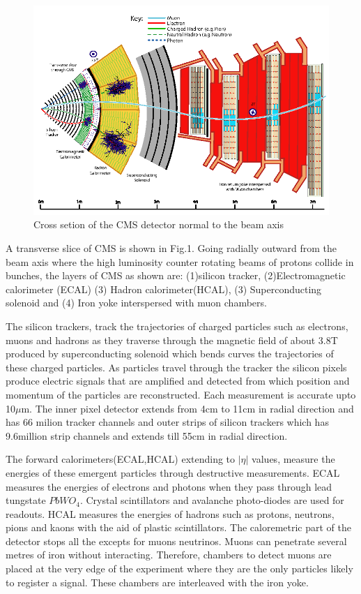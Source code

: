 \documentclass{article}		%
\begin{document}
\begin{figure}[h]
	\includegraphics[scale=0.6]{cms.png} 
	\caption{Cross setion of the CMS detector normal to the beam axis}
	\centering	
\end{figure}

\pagebreak
A transverse slice of CMS is shown in Fig.1.
Going radially outward from the beam axis where the high luminosity counter rotating beams of protons collide in bunches, the layers of CMS as shown are: (1)silicon tracker, (2)Electromagnetic calorimeter (ECAL) (3) Hadron calorimeter(HCAL), (3) Superconducting solenoid and (4) Iron yoke interspersed with muon chambers. 

The silicon trackers, track the trajectories of charged particles such as electrons, muons and hadrons as they traverse through the magnetic field of about 3.8T produced by superconducting solenoid which bends curves the trajectories of these charged particles. As particles travel through the tracker the silicon pixels produce electric signals that are amplified and detected from which position and momentum of the particles are reconstructed. Each measurement is accurate upto 10$\mu$m. The inner pixel detector extends from 4cm to 11cm in radial direction and has 66 milion tracker channels and outer strips of silicon trackers which has 9.6million strip channels and extends till 55cm in radial direction. 

The forward calorimeters(ECAL,HCAL) extending to $|\eta|$ values, measure the energies of these emergent  particles through destructive measurements. ECAL measures the energies of electrons and photons when they pass through lead tungstate $PbWO_4$. Crystal scintillators and avalanche photo-diodes are used for readouts. HCAL measures the energies of hadrons such as protons, neutrons, pions and kaons with the aid of plastic scintillators. The caloremetric part of the detector stops all the  excepts for muons neutrinos. Muons can penetrate several metres of iron without interacting. Therefore, chambers to detect muons are placed at the very edge of the experiment where they are the only particles likely to register a signal. These chambers are 
interleaved with the iron yoke.
\end{document}
